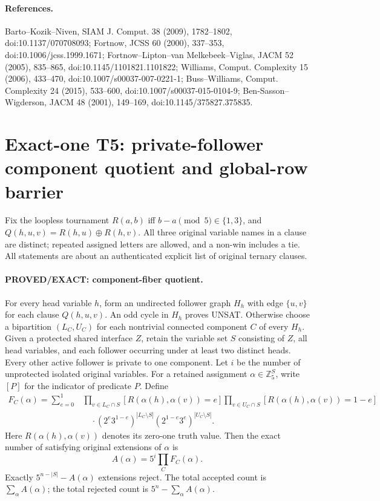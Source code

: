 \documentclass[11pt]{article}
\begin{document}
\paragraph{References.}
Barto--Kozik--Niven, SIAM J. Comput. 38 (2009), 1782--1802,
doi:10.1137/070708093;
Fortnow, JCSS 60 (2000), 337--353, doi:10.1006/jcss.1999.1671;
Fortnow--Lipton--van Melkebeek--Viglas, JACM 52 (2005), 835--865,
doi:10.1145/1101821.1101822;
Williams, Comput. Complexity 15 (2006), 433--470,
doi:10.1007/s00037-007-0221-1;
Buss--Williams, Comput. Complexity 24 (2015), 533--600,
doi:10.1007/s00037-015-0104-9;
Ben-Sasson--Wigderson, JACM 48 (2001), 149--169,
doi:10.1145/375827.375835.


\section{Exact-one T5: private-follower component quotient and global-row barrier}
\label{sec:t5exactone099}
Fix the loopless tournament $R(a,b)$ iff $b-a\pmod5\in\{1,3\}$,
and $Q(h,u,v)=R(h,u)\oplus R(h,v)$.
All three original variable names in a clause are distinct; repeated assigned
letters are allowed, and a non-win includes a tie. All statements are
about an authenticated explicit list of original ternary clauses.

\paragraph{PROVED/EXACT: component-fiber quotient.}
For every head variable $h$, form an undirected follower graph $H_h$ with
edge $\{u,v\}$ for each clause $Q(h,u,v)$. An odd cycle in $H_h$
proves UNSAT. Otherwise choose a bipartition $(L_C,U_C)$ for each
nontrivial connected component $C$ of every $H_h$.
Given a protected shared interface $Z$, retain the variable set
$S$ consisting of $Z$, all head variables, and each follower occurring
under at least two distinct heads. Every other active follower is
private to one component. Let $i$ be the number of unprotected isolated
original variables. For a retained assignment $\alpha\in\mathbb Z_5^S$,
write $[P]$ for the indicator of predicate $P$. Define
\[
\begin{split}
F_C(\alpha)=\sum_{e=0}^1&
\prod_{v\in L_C\cap S}[R(\alpha(h),\alpha(v))=e]
\prod_{v\in U_C\cap S}[R(\alpha(h),\alpha(v))=1-e]\\[-2pt]
&\quad\cdot(2^e3^{1-e})^{|L_C\setminus S|}
(2^{1-e}3^e)^{|U_C\setminus S|}.
\end{split}
\]
Here $R(\alpha(h),\alpha(v))$ denotes its zero-one truth value.
Then the exact number of satisfying original extensions of $\alpha$ is
\[
A(\alpha)=5^i\prod_C F_C(\alpha).
\]
Exactly $5^{n-|S|}-A(\alpha)$ extensions reject. The total accepted
count is $\sum_{\alpha}A(\alpha)$; the total rejected count is
$5^n-\sum_\alpha A(\alpha)$.
\end{document}
